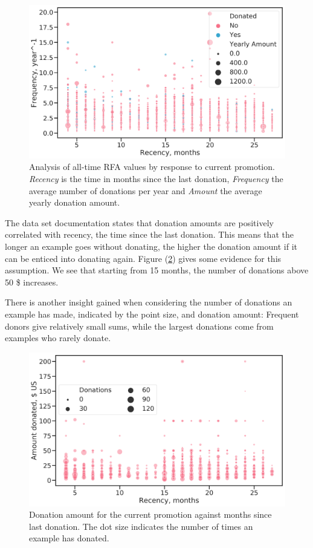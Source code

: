 \documentclass[
  11pt,
  a4paper,
  DIV=12,captions=tableheading,oneside,titlepage]{scrbook}
\begin{document}
\begin{figure}

{\centering \includegraphics[width=0.7\linewidth]{figures/eda/rfa-alltime-current-donors} 

}

\caption{Analysis of all-time RFA values by response to current promotion. \emph{Recency} is the time in months since the last donation, \emph{Frequency} the average number of donations per year and \emph{Amount} the average yearly donation amount.}\label{fig:rfa-alltime}
\end{figure}

The data set documentation states that donation amounts are positively correlated with recency, the time since the last donation. This means that the longer an example goes without donating, the higher the donation amount if it can be enticed into donating again. Figure (\ref{fig:donations-vs-time}) gives some evidence for this assumption. We see that starting from 15 months, the number of donations above 50 \$ increases.

There is another insight gained when considering the number of donations an example has made, indicated by the point size, and donation amount: Frequent donors give relatively small sums, while the largest donations come from examples who rarely donate.



\begin{figure}

{\centering \includegraphics[width=0.7\linewidth]{figures/eda/donations-vs-time-since-last-size-nbr-donations} 

}

\caption{Donation amount for the current promotion against months since last donation. The dot size indicates the number of times an example has donated.}\label{fig:donations-vs-time}
\end{figure}
\end{document}
